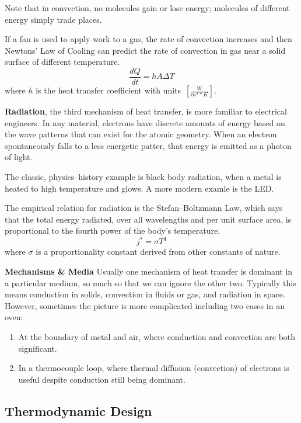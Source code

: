 \documentclass[10pt, twocolumn]{article}
\begin{document}
Note that in convection, no molecules gain or lose energy;
molecules of different energy simply trade places.

If a fan is used to apply work to a gas, the rate of convection
increases and then Newtons' Law of Cooling can predict the
rate of convection in gas near a solid surface of different
temperature.
\begin{equation}
\frac{dQ}{dt}=hA\Delta T
\label{newtons-cooling-law}
\end{equation}
where \(h\) is the heat transfer coefficient with \mbox{units \(\left[\frac{W}{m^{2}*K}\right]\)}.

\textbf{Radiation}, the third mechanism of heat transfer, is more
familiar to electrical engineers. In any material, electrons
have discrete amounts of energy based on the wave patterns that can
exist for the atomic geometry. When an electron spontaneously falls
to a less energetic patter, that energy is emitted as a photon of
light.

The classic, physics--history example is black body radiation,
when a metal is heated to high temperature and glows.
A more modern examle is the LED.

The empirical relation for radiation is the Stefan--Boltzmann Law,
which says that the total energy radiated, over all wavelengths
and per unit surface area, is proportional to the fourth power of
the body's temperature.
\begin{equation}
j^{*}=\sigma T^{4}
\end{equation}
where $\sigma$ is a proportionality constant derived from other
constants of nature.

\textbf{Mechanisms \& Media} Usually one mechanism of heat transfer
is dominant in a particular medium, so much so that we can ignore the
other two. Typically this means conduction in solids,
convection in fluids or gas, and radiation in space.
However, sometimes the picture is more complicated including
two cases in an oven:
\begin{enumerate}
	\item At the boundary of metal and air, where conduction
	and convection are both significant.
	\item In a thermocouple loop, where thermal diffusion (convection)
	of electrons is useful despite conduction still being dominant.
\end{enumerate}

\subsection{Thermodynamic Design}
\label{thermodynamic-design-section}
\end{document}
